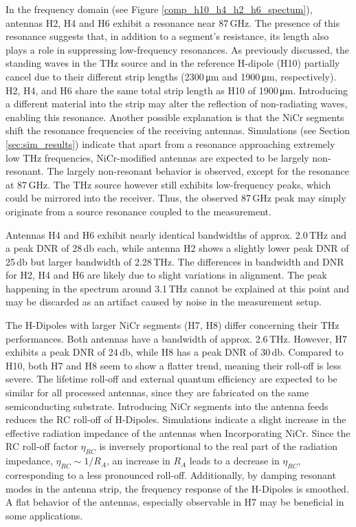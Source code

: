 In the frequency domain (see Figure \ref{comp_h10_h4_h2_h6_spectum}), antennas H2, H4 and H6 exhibit a resonance near \num{87}\,\si{\giga\hertz}. The presence of this resonance suggests that, in addition to a segment’s resistance, its length also plays a role in suppressing low-frequency resonances. As previously discussed, the standing waves in the THz source and in the reference H-dipole (H10) partially cancel due to their different strip lengths (\num{2300}\,\si{\micro\meter} and \num{1900}\,\si{\micro\meter}, respectively). H2, H4, and H6 share the same total strip length as H10 of \num{1900}\,\si{\micro\meter}. Introducing a different material into the strip may alter the reflection of non-radiating waves, enabling this resonance. Another possible explanation is that the NiCr segments shift the resonance frequencies of the receiving antennas. Simulations (see Section \ref{sec:sim_results}) indicate that apart from a resonance approaching extremely low THz frequencies, NiCr-modified antennas are expected to be largely non-resonant. The largely non-resonant behavior is observed, except for the resonance at \num{87}\,\si{\giga \hertz}. The THz source however still exhibits low-frequency peaks, which could be mirrored into the receiver. Thus, the observed \num{87}\,\si{\giga\hertz} peak may simply originate from a source resonance coupled to the measurement. 

Antennas H4 and H6 exhibit nearly identical bandwidths of approx. \num{2.0}\,\si{\tera \hertz} and a peak DNR of \num{28}\,\si{\decibel} each, while antenna H2 shows a slightly lower peak DNR of \num{25}\,\si{\decibel} but larger bandwidth of \num{2.28}\,\si{\tera\hertz}. The differences in bandwidth and DNR for H2, H4 and H6 are likely due to slight variations in alignment. The peak happening in the spectrum around \num{3.1}\,\si{\tera \hertz} cannot be explained at this point and may be discarded as an artifact caused by noise in the measurement setup.

The H-Dipoles with larger NiCr segments (H7, H8) differ concerning their THz performances. Both antennas have a bandwidth of approx. \num{2.6}\,\si{\tera \hertz}. However, H7 exhibits a peak DNR of \num{24}\,\si{\decibel}, while H8 has a peak DNR of \num{30}\,\si{\decibel}. Compared to H10, both H7 and H8 seem to show a flatter trend, meaning their roll-off is less severe. The lifetime roll-off and external quantum efficiency are expected to be similar for all processed antennas, since they are fabricated on the same semiconducting substrate. Introducing NiCr segments into the antenna feeds reduces the RC roll-off of H-Dipoles. Simulations indicate a slight increase in the effective radiation impedance of the antennas when Incorporating NiCr. Since the RC roll-off factor $\eta_{RC}$ is inversely proportional to the real part of the radiation impedance, $\eta_{RC} \sim 1/R_A$, an increase in $R_A$ leads to a decrease in $\eta_{RC}$, corresponding to a less pronounced roll-off. Additionally, by damping resonant modes in the antenna strip, the frequency response of the H-Dipoles is smoothed. A flat behavior of the antennas, especially observable in H7 may be beneficial in some applications. 


